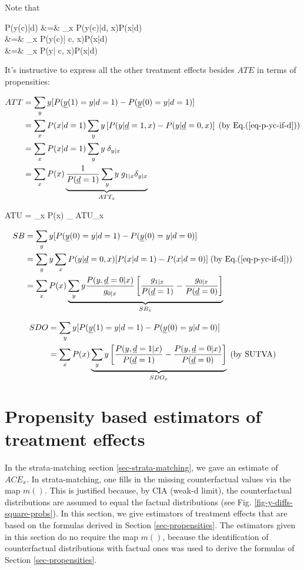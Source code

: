 Note that

\beqa
P(y(c)|d)
&=&
\sum_x P(y(c)|d, x)P(x|d)
\\
&=&
\sum_x P(y(c)| c, x)P(x|d) \;
\\
&=&
\sum_x P(y| c, x)P(x|d)\;
\label{eq-p-yc-if-d}
\eeqa

It's 
instructive
to express all the 
other treatment effects besides 
$ATE$ in terms of propensities: 

\begin{align}
ATT
&=
 \sum_y y [P({\underline{y}}(1)=y|d=1)
-P({\underline{y}}(0)=y|d=1)]
\\
&=
\sum_x P(x|d=1)
\sum_y y
\left[
P(y|{\underline{d}}=1,x)
-
P(y|{\underline{d}}=0,x)
\right]
\;\text{(by Eq.(\ref{eq-p-yc-if-d}))}
\\
&=
\sum_x P(x|d=1)
\sum_y y \;\delta_{y|x}
\\
&=
\sum_x P(x)
\underbrace{
\frac{1}{P({\underline{d}}=1)}
\sum_y y\; g_{1|x}\delta_{y|x}
}_
{ATT_x}
\end{align}

\beq
ATU
=
\sum_x P(x)
_
{ATU_x}
\eeq

\begin{align}
SB&= \sum_y y
[P({\underline{y}}(0)=y|d=1)-P({\underline{y}}(0)=y|d=0)]
\\
&=
\sum_y y
\sum_x P(y| {\underline{d}}=0,x)
[
P(x|d=1)-P(x|d=0)]
\;\text{(by Eq.(\ref{eq-p-yc-if-d}))}
\\
&=
\sum_x P(x)
\underbrace{\sum_y y
\frac{P(y, {\underline{d}}=0|x)}{g_{0|x}}
\left[
\frac{g_{1|x}}{P({\underline{d}}=1)}
-
\frac{g_{0|x}}{P({\underline{d}}=0)}
\right]}_{SB_x}
\end{align}

\begin{align}
SDO
&=
\sum_y y
[P({\underline{y}}(1)=y|d=1)-P({\underline{y}}(0)=y|d=0)]
\\
&=
\sum_x P(x)
\underbrace{\sum_y y
\left[
\frac{P(y, {\underline{d}}=1|x)}{P({\underline{d}}=1)}
-
\frac{P(y, {\underline{d}}=0|x)}{P({\underline{d}}=0)}
\right]}_{SDO_x}
\;\text{(by SUTVA)}
\end{align}

\section{Propensity based  estimators of
treatment effects}

In the  strata-matching
section \ref{sec-strata-matching}, we gave an estimate
of $ACE_x$.
In strata-matching, one 
fills in the missing 
counterfactual values
via the map $m()$.
This is justified 
because,
by CIA (weak-d limit),
the counterfactual
distributions 
are assumed to equal
the factual distributions (see Fig.
\ref{fig-y-diffs-square-probs}).
In this 
section,
we give estimators
of treatment effects that
are based on the  formulas derived
in Section \ref{sec-propensities}.
The estimators given in this section
do no require
the map $m()$, because
the identification of
counterfactual distributions
with factual ones was used to
derive the formulas  
of  Section \ref{sec-propensities}.




